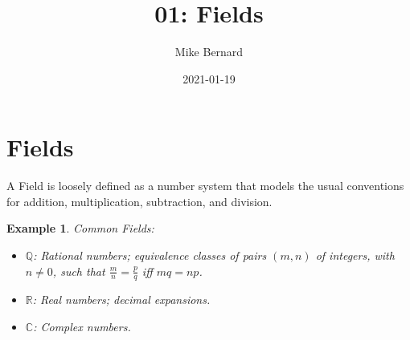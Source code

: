 \documentclass[10pt, oneside]{article}
\title{01: Fields}
\author{Mike Bernard}
\date{2021-01-19}
\newcommand{\R}{\mathbb{R}}
\newcommand{\C}{\mathbb{C}}
\newcommand{\Q}{\mathbb{Q}}
\newtheorem{ex}{Example}
\begin{document}
\maketitle
\tableofcontents
\vspace{0.25in}

\section{Fields}

A Field is loosely defined as a number system that models the usual conventions for addition, multiplication, subtraction, and division.

\begin{ex} Common Fields:
    \begin{itemize}
        \item $\Q$: Rational numbers; equivalence classes of pairs $(m, n)$ of integers, with $n \neq 0$, such that $\frac{m}{n} = \frac{p}{q}$ iff $mq = np$.
        \item $\R$: Real numbers; decimal expansions.
        \item $\C$: Complex numbers.
    \end{itemize}
\end{ex}
\end{document}
